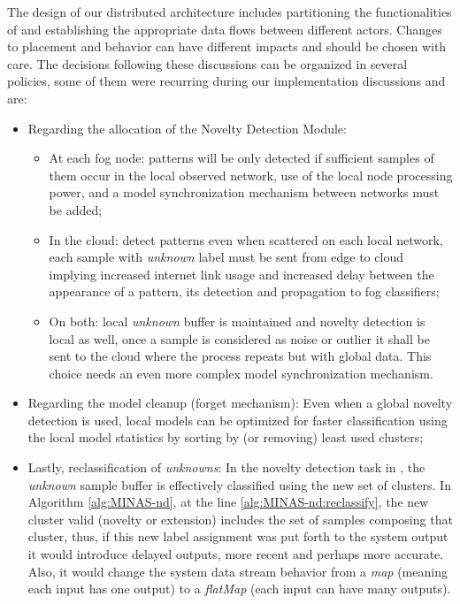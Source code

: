 The design of our distributed \nd architecture includes partitioning the
functionalities of \minas and establishing the appropriate data flows
between different actors.
Changes to placement and behavior can have different impacts and should be
chosen with care.
The decisions following these discussions can be organized in several policies,
some of them were recurring during our implementation discussions and are:

\begin{itemize}
  \item Regarding the allocation of the Novelty Detection Module:
  \begin{itemize}
    
    \item At each fog node: patterns will be only detected if sufficient samples
    of them occur in the local observed network, use of the local node
    processing power, and a model synchronization mechanism between networks
    must be added;

    \item In the cloud: detect patterns even when scattered on each local
    network, each sample with \emph{unknown} label must be sent from edge to
    cloud implying increased internet link usage and increased delay between the
    appearance of a pattern, its detection and propagation to fog classifiers;

    \item On both: local \emph{unknown} buffer is maintained and novelty
    detection is local as well, once a sample is considered as noise or outlier
    it shall be sent to the cloud where the process repeats but with global
    data.
    This choice needs an even more complex model synchronization mechanism.

  \end{itemize}
    
  \item Regarding the model cleanup (forget mechanism): Even when a global
  novelty detection is used, local models can be optimized for faster
  classification using the local model statistics by sorting by (or removing)
  least used clusters;

  \item Lastly, reclassification of \emph{unknowns}: In the novelty detection
  task in \minas, the \emph{unknown} sample buffer is effectively classified
  using the new set of clusters.
  In Algorithm \ref{alg:MINAS-nd}, at the line \ref{alg:MINAS-nd:reclassify}, the
  new cluster valid (novelty or extension) includes the set of samples composing
  that cluster, thus, if this new label assignment was put forth to the system
  output it would introduce delayed outputs, more recent and perhaps more
  accurate.
  Also, it would change the system data stream behavior from a \emph{map}
  (meaning each input has one output) to a \emph{flatMap} (each input can have
  many outputs).

\end{itemize}


